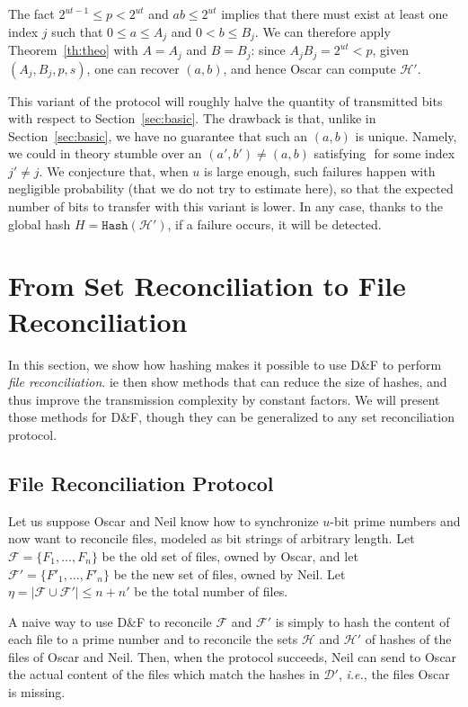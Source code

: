 \documentclass[twoside,envcountsame,runningheads]{llncs}
\newcommand{\Set}{\mathcal{H}}
\newcommand{\SetD}{\mathcal{D}}
\newcommand{\Files}{\mathcal{F}}
\newcommand{\df}{D\&F\xspace}
\newcommand{\ie}{\textit{i.e.}\xspace}
\newcommand{\Hash}{\ensuremath{\mathtt{Hash}}}
\begin{document}
The fact $2^{ut-1}\leq p < 2^{ut}$ and $ab \leq 2^{ut}$ implies that there must exist at least one index $j$ such that $0 \leq a \leq A_j$ and $0 <b \leq B_j$. 
We can therefore apply Theorem~\ref{th:theo} with $A = A_j$ and $B = B_j$: since $A_j B_j = 2^{ut} < p$, given $(A_j,B_j,p,s)$, one can recover $(a,b)$, and hence Oscar can compute $\Set'$.

This variant of the protocol will roughly halve the quantity of transmitted bits with respect to Section~\ref{sec:basic}.
The drawback is that, unlike in Section~\ref{sec:basic}, we have no guarantee that such an $(a,b)$ is unique. Namely, we could in theory stumble over an $(a',b')\neq (a,b)$ satisfying $ $ for some index $j' \neq j$. We conjecture that, when $u$ is large enough, such failures happen with negligible probability (that we do not try to estimate here), so that the expected number of bits to transfer with this variant is lower.
In any case, thanks to the global hash $H = \Hash(\Set')$, if a failure occurs, it will be detected.

\section{From Set Reconciliation to File Reconciliation}
\label{sec:hashing}

In this section, we show how hashing makes it possible to use \df to perform \emph{file reconciliation}.
ie then show methods that can reduce the size of hashes, and thus improve the transmission complexity by constant factors. We will present those methods for \df, though they can be generalized to any set reconciliation protocol.

\subsection{File Reconciliation Protocol}

Let us suppose Oscar and Neil know how to synchronize $u$-bit prime numbers and now want to reconcile files, modeled as bit strings of arbitrary length.
Let $\Files = \{F_1,\dots,F_n\}$ be the old set of files, owned by Oscar, and let $\Files' = \{F'_1,\dots,F'_n\}$ be the new set of files, owned by Neil.
Let $\eta = | \Files \cup \Files'| \le n+n'$ be the total number of files.

A naive way to use \df to reconcile $\Files$ and $\Files'$ is simply to hash the content of each file to a prime number and to reconcile the sets $\Set$ and $\Set'$ of hashes of the files of Oscar and Neil.
Then, when the protocol succeeds, Neil can send to Oscar the actual content of the files which match the hashes in $\SetD'$, \ie, the files Oscar is missing.
\end{document}
